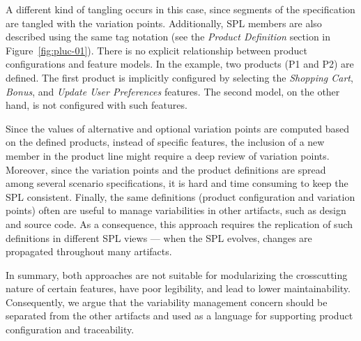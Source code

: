 \documentclass[11pt]{report}
\begin{document}
A different kind of tangling occurs in this case, since segments of the
specification are tangled with the variation points. Additionally, SPL members
are also described using the same tag notation (see the \emph{Product Definition}
section in Figure~\ref{fig:pluc-01}). There is no explicit relationship between
product configurations and feature models. In the example, two products (P1 and
P2) are defined. The first product is implicitly configured by selecting the
\emph{Shopping Cart}, \emph{Bonus}, and \emph{Update User Preferences} features.
The second model, on the other hand, is not configured with such features.

Since the values of alternative and optional variation points are computed based
on the defined products, instead of specific features, the inclusion of a new
member in the product line might require a deep review of variation points.
Moreover, since the variation points and the product definitions are spread among
several scenario specifications, it is hard and time consuming to keep the SPL
consistent. Finally, the same definitions (product configuration and variation
points) often are useful to manage variabilities in other artifacts, such as
design and source code. As a consequence, this approach requires the replication
of such definitions in different SPL views --- when the SPL evolves, changes are
propagated throughout many artifacts.

In summary, both approaches are not suitable for modularizing the crosscutting
nature of certain features, have poor legibility, and lead to lower
maintainability. Consequently, we argue that the variability
management concern should be separated from the other artifacts and used as a
language for supporting product configuration and traceability. 


\end{document}
